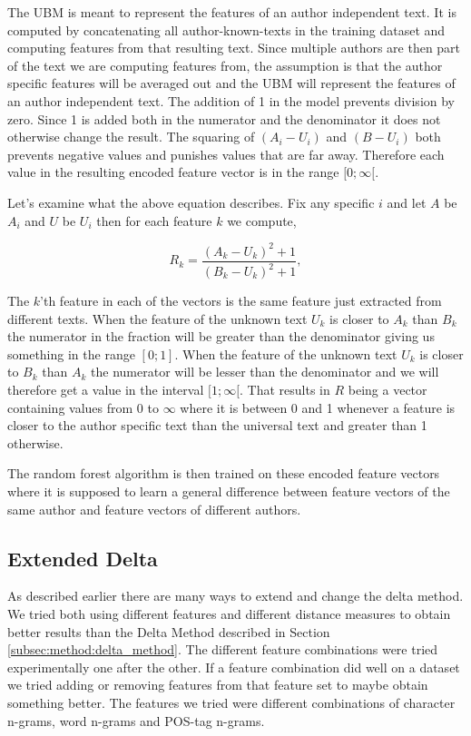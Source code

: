 The \gls{UBM} is meant to represent the features of an author independent
text. It is computed by concatenating all author-known-texts in the training
dataset and computing features from that resulting text. Since multiple authors
are then part of the text we are computing features from, the assumption is
that the author specific features will be averaged out and the \gls{UBM} will
represent the features of an author independent text. The addition of 1 in the
model prevents division by zero. Since 1 is added both in the numerator and the
denominator it does not otherwise change the result. The squaring of $(A_i -
U_i)$ and $(B - U_i)$ both prevents negative values and punishes values that are
far away. Therefore each value in the resulting encoded feature vector is in the
range $[0; \infty[$.

Let's examine what the above equation describes. Fix any specific $i$ and let
$A$ be $A_i$ and $U$ be $U_i$ then for each feature $k$ we compute,

\begin{equation}
\label{eq:rf-encode}
    R_k = \frac{(A_k-U_k)^2+1}{(B_k-U_k)^2+1},
\end{equation}

The $k$'th feature in each of the vectors is the same feature just extracted
from different texts. When the feature of the unknown text $U_k$ is closer to
$A_k$ than $B_k$ the numerator in the fraction will be greater than the
denominator giving us something in the range $[0; 1]$. When the feature of the
unknown text $U_k$ is closer to $B_k$ than $A_k$ the numerator will be lesser
than the denominator and we will therefore get a value in the interval
$[1; \infty[$. That results in $R$ being a vector containing values from 0 to
$\infty$ where it is between 0 and 1 whenever a feature is closer to the author
specific text than the universal text and greater than 1 otherwise.

The random forest algorithm is then trained on these encoded feature vectors
where it is supposed to learn a general difference between feature vectors of
the same author and feature vectors of different authors.

\subsection{Extended Delta} \label{subsec:method:extended_delta}
As described earlier there are many ways to extend and change the delta
method. We tried both using different features and different distance
measures to obtain better results than the Delta Method described in Section
\ref{subsec:method:delta_method}. The different feature combinations were tried
experimentally one after the other. If a feature combination did well on a
dataset we tried adding or removing features from that feature set to maybe
obtain something better. The features we tried were different combinations of
character n-grams, word n-grams and \gls{POS}-tag n-grams.

